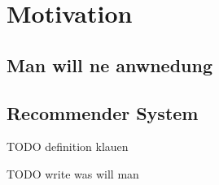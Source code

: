 \chapter{Motivation}
\section{Man will ne anwnedung}
\section{Recommender System}
TODO definition klauen

TODO write
was will man
